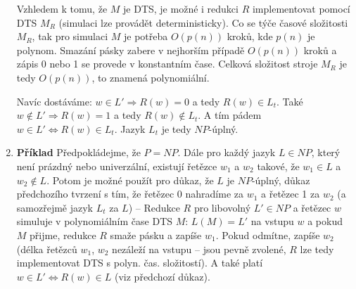 \documentclass[a4paper,12pt]{article}
\begin{document}
\begin{enumerate}[label=\textbf{\arabic*}.]
  Vzhledem k tomu, že $M$ je DTS, je možné i redukci $R$ implementovat pomocí DTS $M_R$ (simulaci lze provádět
  deterministicky). Co se týče časové složitosti $M_R$, tak pro simulaci $M$ je potřeba $O(p(n))$ kroků, kde $p(n)$ je polynom. 
  Smazání pásky zabere v nejhorším případě $O(p(n))$ kroků a zápis 0 nebo 1 se provede v konstantním čase.
  Celková složitost stroje $M_R$ je tedy $O(p(n))$, to znamená polynomiální.
  
  Navíc dostáváme: $w\in L' \Rightarrow R(w) = 0 $ a tedy $ R(w) \in L_t$. Také
  $w\notin L' \Rightarrow R(w) = 1 $ a tedy $ R(w) \notin L_t$. A tím pádem $w\in L' \Leftrightarrow R(w) \in L_t$.
  Jazyk $L_t$ je tedy $NP$-úplný.
  
 \item {\bfseries Příklad} 
  Předpokládejme, že $P = NP$. Dále pro každý jazyk $L\in NP$, který není prázdný nebo univerzální, existují řetězce $w_1$ a $w_2$
  takové, že $w_1 \in L$ a $w_2\notin L$. Potom je možné použít pro důkaz, že $L$ je $NP$-úplný, důkaz předchozího tvrzení s tím, že 
  řetězec 0 nahradíme za $w_1$ a řetězec 1 za $w_2$ (a samozřejmě jazyk $L_t$ za $L$) -- Redukce $R$ pro libovolný $L' \in NP$ a řetězec $w$
  simuluje v polynomiálním čase DTS $M$: $L(M) = L'$ na vstupu $w$ a pokud $M$ přijme, redukce $R$ smaže pásku a zapíše $w_1$. Pokud odmítne, zapíše $w_2$ (délka řetězců $w_1$, $w_2$ nezáleží na vstupu -- jsou pevně zvolené, $R$ lze tedy implementovat DTS s polyn. čas. složitostí). 
  A také platí $w\in L' \Leftrightarrow R(w) \in L$ (viz předchozí důkaz).
  
\end{enumerate}
\end{document}
